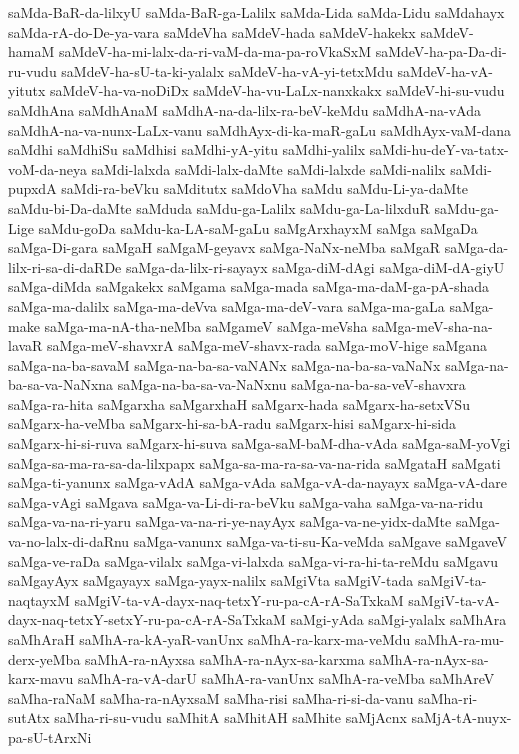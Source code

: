 {saMda-BaR-da-lilxyU
saMda-BaR-ga-Lalilx
saMda-Lida
saMda-Lidu
saMdahayx
saMda-rA-do-De-ya-vara
saMdeVha
saMdeV-hada
saMdeV-hakekx
saMdeV-hamaM
saMdeV-ha-mi-lalx-da-ri-vaM-da-ma-pa-roVkaSxM
saMdeV-ha-pa-Da-di-ru-vudu
saMdeV-ha-sU-ta-ki-yalalx
saMdeV-ha-vA-yi-tetxMdu
saMdeV-ha-vA-yitutx
saMdeV-ha-va-noDiDx
saMdeV-ha-vu-LaLx-nanxkakx
saMdeV-hi-su-vudu
saMdhAna
saMdhAnaM
saMdhA-na-da-lilx-ra-beV-keMdu
saMdhA-na-vAda
saMdhA-na-va-nunx-LaLx-vanu
saMdhAyx-di-ka-maR-gaLu
saMdhAyx-vaM-dana
saMdhi
saMdhiSu
saMdhisi
saMdhi-yA-yitu
saMdhi-yalilx
saMdi-hu-deY-va-tatx-voM-da-neya
saMdi-lalxda
saMdi-lalx-daMte
saMdi-lalxde
saMdi-nalilx
saMdi-pupxdA
saMdi-ra-beVku
saMditutx
saMdoVha
saMdu
saMdu-Li-ya-daMte
saMdu-bi-Da-daMte
saMduda
saMdu-ga-Lalilx
saMdu-ga-La-lilxduR
saMdu-ga-Lige
saMdu-goDa
saMdu-ka-LA-saM-gaLu
saMgArxhayxM
saMga
saMgaDa
saMga-Di-gara
saMgaH
saMgaM-geyavx
saMga-NaNx-neMba
saMgaR
saMga-da-lilx-ri-sa-di-daRDe
saMga-da-lilx-ri-sayayx
saMga-diM-dAgi
saMga-diM-dA-giyU
saMga-diMda
saMgakekx
saMgama
saMga-mada
saMga-ma-daM-ga-pA-shada
saMga-ma-dalilx
saMga-ma-deVva
saMga-ma-deV-vara
saMga-ma-gaLa
saMga-make
saMga-ma-nA-tha-neMba
saMgameV
saMga-meVsha
saMga-meV-sha-na-lavaR
saMga-meV-shavxrA
saMga-meV-shavx-rada
saMga-moV-hige
saMgana
saMga-na-ba-savaM
saMga-na-ba-sa-vaNANx
saMga-na-ba-sa-vaNaNx
saMga-na-ba-sa-va-NaNxna
saMga-na-ba-sa-va-NaNxnu
saMga-na-ba-sa-veV-shavxra
saMga-ra-hita
saMgarxha
saMgarxhaH
saMgarx-hada
saMgarx-ha-setxVSu
saMgarx-ha-veMba
saMgarx-hi-sa-bA-radu
saMgarx-hisi
saMgarx-hi-sida
saMgarx-hi-si-ruva
saMgarx-hi-suva
saMga-saM-baM-dha-vAda
saMga-saM-yoVgi
saMga-sa-ma-ra-sa-da-lilxpapx
saMga-sa-ma-ra-sa-va-na-rida
saMgataH
saMgati
saMga-ti-yanunx
saMga-vAdA
saMga-vAda
saMga-vA-da-nayayx
saMga-vA-dare
saMga-vAgi
saMgava
saMga-va-Li-di-ra-beVku
saMga-vaha
saMga-va-na-ridu
saMga-va-na-ri-yaru
saMga-va-na-ri-ye-nayAyx
saMga-va-ne-yidx-daMte
saMga-va-no-lalx-di-daRnu
saMga-vanunx
saMga-va-ti-su-Ka-veMda
saMgave
saMgaveV
saMga-ve-raDa
saMga-vilalx
saMga-vi-lalxda
saMga-vi-ra-hi-ta-reMdu
saMgavu
saMgayAyx
saMgayayx
saMga-yayx-nalilx
saMgiVta
saMgiV-tada
saMgiV-ta-naqtayxM
saMgiV-ta-vA-dayx-naq-tetxY-ru-pa-cA-rA-SaTxkaM
saMgiV-ta-vA-dayx-naq-tetxY-setxY-ru-pa-cA-rA-SaTxkaM
saMgi-yAda
saMgi-yalalx
saMhAra
saMhAraH
saMhA-ra-kA-yaR-vanUnx
saMhA-ra-karx-ma-veMdu
saMhA-ra-mu-derx-yeMba
saMhA-ra-nAyxsa
saMhA-ra-nAyx-sa-karxma
saMhA-ra-nAyx-sa-karx-mavu
saMhA-ra-vA-darU
saMhA-ra-vanUnx
saMhA-ra-veMba
saMhAreV
saMha-raNaM
saMha-ra-nAyxsaM
saMha-risi
saMha-ri-si-da-vanu
saMha-ri-sutAtx
saMha-ri-su-vudu
saMhitA
saMhitAH
saMhite
saMjAcnx
saMjA-tA-nuyx-pa-sU-tArxNi
}
